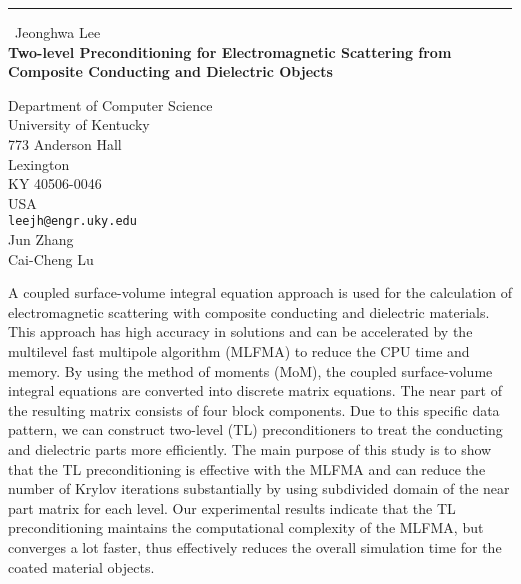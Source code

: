 \documentclass{report}
\begin{document}
\begin{center}
\rule{6in}{1pt} \
{\large Jeonghwa Lee \\
{\bf Two-level Preconditioning for Electromagnetic Scattering from Composite Conducting and Dielectric Objects}}

Department of Computer Science \\ University of Kentucky \\ 773 Anderson Hall \\ Lexington \\ KY 40506-0046 \\ USA
\\
{\tt leejh@engr.uky.edu}\\
Jun Zhang\\
Cai-Cheng Lu\end{center}

A coupled surface-volume integral equation approach is used for the
calculation of electromagnetic scattering with composite
conducting and dielectric materials. This approach has
high accuracy in solutions and can be accelerated by the multilevel
fast multipole algorithm (MLFMA) to reduce the CPU time and memory.
By using the method of moments (MoM), the coupled surface-volume
integral equations are converted into discrete matrix equations.
The near part of the resulting matrix consists
of four block components. Due to this specific data pattern, we
can construct two-level (TL) preconditioners to treat the
conducting and dielectric parts more efficiently.
The main purpose of this study is to show that
the TL preconditioning is effective with the MLFMA and
can reduce the number of
Krylov iterations substantially by using subdivided domain of
the near part matrix for each level.
Our experimental results indicate that the
TL preconditioning maintains the computational complexity of
the MLFMA, but converges a lot faster, thus effectively reduces
the overall simulation time for the coated material objects.
\end{document}
